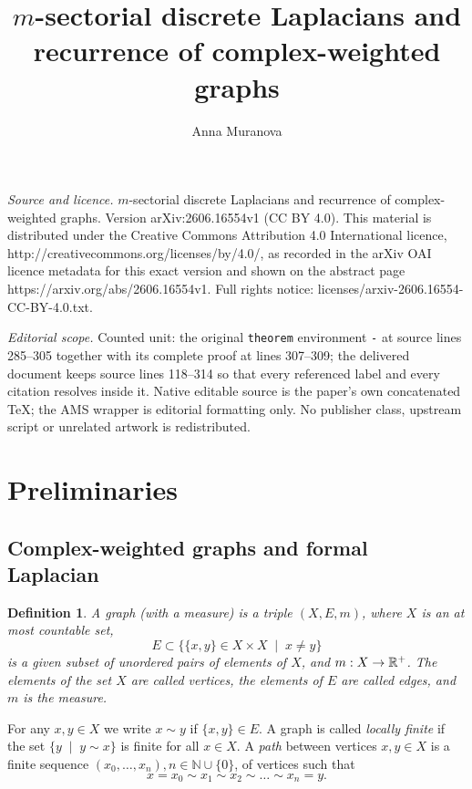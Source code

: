 \documentclass[10pt,a4paper]{amsart}
\newtheorem{definition}[theorem]{Definition}
\begin{document}
\title[m-sectorial discrete Laplacians and recurrence of complex-we]{$m$-sectorial discrete Laplacians and recurrence of complex-weighted graphs}
\author{Anna Muranova}
\date{}
\maketitle
\noindent\emph{Source and licence.} $m$-sectorial discrete Laplacians and recurrence of complex-weighted graphs. Version arXiv:2606.16554v1 (CC BY 4.0). This material is distributed under the Creative Commons Attribution 4.0 International licence, http://creativecommons.org/licenses/by/4.0/, as recorded in the arXiv OAI licence metadata for this exact version and shown on the abstract page https://arxiv.org/abs/2606.16554v1. Full rights notice: licenses/arxiv-2606.16554-CC-BY-4.0.txt.\par\smallskip
\noindent\textit{Editorial scope.} Counted unit: the original \texttt{theorem} environment \texttt{-} at source lines 285--305 together with its complete proof at lines 307--309; the delivered document keeps source lines 118--314 so that every referenced label and every citation resolves inside it. Native editable source is the paper's own concatenated TeX; the AMS wrapper is editorial formatting only. No publisher class, upstream script or unrelated artwork is redistributed.
\section{Preliminaries}
\label{sect::preliminaries}
\subsection{Complex-weighted graphs and formal Laplacian}

\begin{definition}\label{def::graph}
A {\em graph (with a measure)} is a triple $(X,E,m)$, where $X$ is an at most countable set, 
$$
E
 \subset \{\{x,y\}\in X\times X\;\mid\;x\ne y\}
 $$ 
 is a given subset of unordered pairs of elements of $X$, and $m:X\to\Bbb R^+$. The elements of the set $X$ are called {\em vertices}, the elements of $E$ are called {\em edges}, and $m$ is the {\em measure}.
\end{definition}

For any $x,y\in X$ we write $x\sim y$ if $\{x,y\}\in E$. A graph is called {\em locally finite} if the set
$
\{y\;\mid\;y\sim x\}
$ is finite for all $x\in X$.  A {\em path} between  vertices $x,y\in X$ is a finite sequence $(x_0,\ldots,x_{n}), n\in \mathbb N\cup\{0\}$,  of vertices such that
$$
x=x_0\sim x_1\sim x_2\sim \dots \sim x_n=y.
$$
\end{document}
